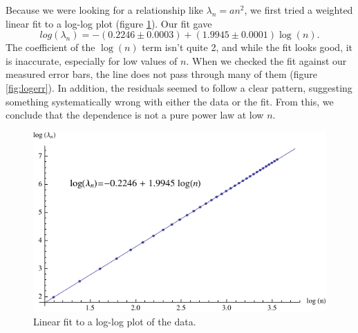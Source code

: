 \documentclass[12pt,twoside]{reedthesis}
\newcommand{\eqn}[1]{\begin{equation}#1\end{equation}}
\begin{document}
Because we were looking for a relationship like $\lambda_n = a n^2$, we first tried a weighted linear fit to a log-log plot (figure \ref{fig:loglog}). Our fit gave
\eqn{
log(\lambda_n) = -(0.2246 \pm 0.0003) + (1.9945 \pm 0.0001) \log(n)\mbox{.}
\label{eq:logfit}
} 
The coefficient of the $\log(n)$ term isn't quite 2, and while the fit looks good, it is inaccurate, especially for low values of $n$. When we checked the fit against our measured error bars, the line does not pass through many of them (figure \ref{fig:logerr}). In addition, the residuals seemed to follow a clear pattern, suggesting something systematically wrong with either the data or the fit. From this, we conclude that the dependence is not a pure power law at low $n$.
\begin{figure}[h]
\centering
\includegraphics{Figures/loglog}
\caption[Log-log fit]{Linear fit to a log-log plot of the data.}
\label{fig:loglog}
\end{figure}
\end{document}
